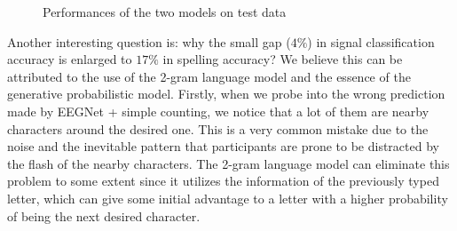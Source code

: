 \documentclass{article}
\begin{document}
\vspace{-3mm}
\begin{figure}[H]
	\centering
	\qquad
	\hspace{-8mm}
	\caption{Performances of the two models on test data}
	\label{fig:9}
\end{figure}

\vspace{-3mm}
Another interesting question is: why the small gap ($4\%$) in signal classification accuracy is enlarged to $17\%$ in spelling accuracy? We believe this can be attributed to the use of the 2-gram language model and the essence of the generative probabilistic model. Firstly, when we probe into the wrong prediction made by EEGNet + simple counting, we notice that a lot of them are nearby characters around the desired one. This is a very common mistake due to the noise and the inevitable pattern that participants are prone to be distracted by the flash of the nearby characters. The 2-gram language model can eliminate this problem to some extent since it utilizes the information of the previously typed letter, which can give some initial advantage to a letter with a higher probability of being the next desired character.\\
\end{document}
